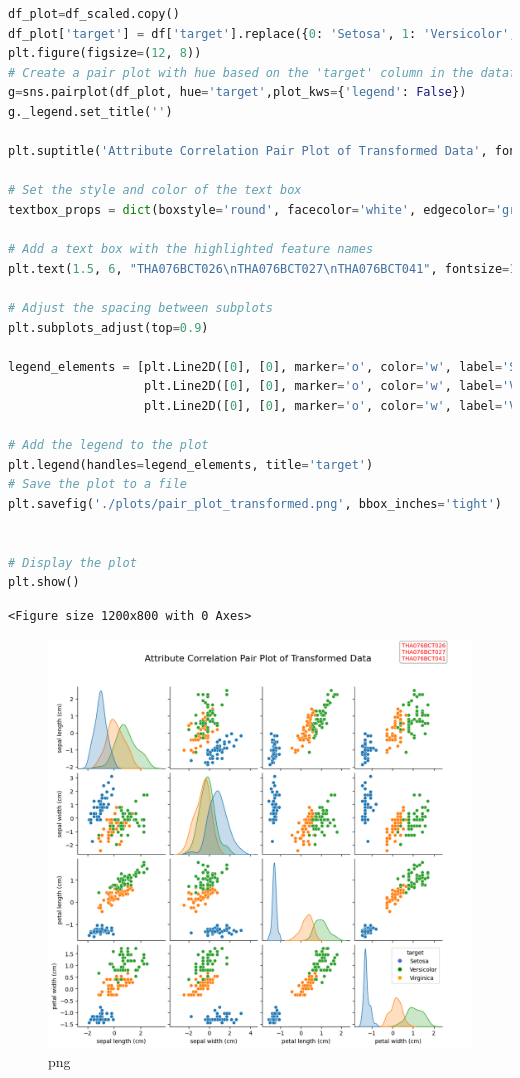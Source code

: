 \documentclass[
]{article}
\begin{document}
\begin{lstlisting}[language=Python]
df_plot=df_scaled.copy()
df_plot['target'] = df['target'].replace({0: 'Setosa', 1: 'Versicolor', 2: 'Virginica'})
plt.figure(figsize=(12, 8))
# Create a pair plot with hue based on the 'target' column in the dataframe
g=sns.pairplot(df_plot, hue='target',plot_kws={'legend': False})
g._legend.set_title('')

plt.suptitle('Attribute Correlation Pair Plot of Transformed Data', fontsize=16, y=0.98)

# Set the style and color of the text box
textbox_props = dict(boxstyle='round', facecolor='white', edgecolor='gray', alpha=0.8)

# Add a text box with the highlighted feature names
plt.text(1.5, 6, "THA076BCT026\nTHA076BCT027\nTHA076BCT041", fontsize=10, color='red', ha='center', bbox=textbox_props)

# Adjust the spacing between subplots
plt.subplots_adjust(top=0.9)

legend_elements = [plt.Line2D([0], [0], marker='o', color='w', label='Setosa', markerfacecolor='royalblue', markersize=8),
                   plt.Line2D([0], [0], marker='o', color='w', label='Versicolor', markerfacecolor='g', markersize=8),
                   plt.Line2D([0], [0], marker='o', color='w', label='Virginica', markerfacecolor='orange', markersize=8)]

# Add the legend to the plot
plt.legend(handles=legend_elements, title='target')
# Save the plot to a file
plt.savefig('./plots/pair_plot_transformed.png', bbox_inches='tight')


# Display the plot
plt.show()
\end{lstlisting}

\begin{lstlisting}
<Figure size 1200x800 with 0 Axes>
\end{lstlisting}

\begin{figure}
\centering
\includegraphics{PCA on IRIS_files/PCA on IRIS_17_1.png}
\caption{png}
\end{figure}
\end{document}
